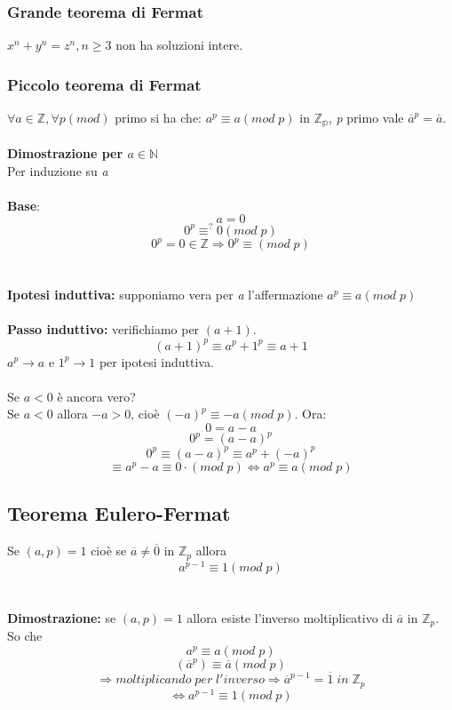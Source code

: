 \subsubsection{Grande teorema di Fermat}
\(x^n+y^n=z^n, n\geq 3\) non ha soluzioni intere.

\subsubsection{Piccolo teorema di Fermat}
\(\forall a\in\mathbb{Z}, \forall p(mod)\) primo si ha che: \(a^p\equiv a(mod\;p)\) in \(\mathbb{Z_p}\), \textit{p} primo vale \(\overline{a}^p=\overline{a}\).
\\\\
\textbf{Dimostrazione per \(a\in\mathbb{N}\)}
\\Per induzione su \textit{a}
\\\\\textbf{Base}: \[a=0\]
\[0^p\equiv ^? 0(mod\;p)\]
\[0^p=0\in\mathbb{Z}\Rightarrow 0^p\equiv (mod\;p)\]
\\\\
\textbf{Ipotesi induttiva:} supponiamo vera per \textit{a} l'affermazione \(a^p\equiv a(mod\;p)\)
\\\\
\textbf{Passo induttivo:} verifichiamo per \((a+1)\).
\[(a+1)^p\equiv a^p+1^p \equiv a+1\]
\(a^p\rightarrow a\) e \(1^p\rightarrow 1\) per ipotesi induttiva.
\\\\
Se \(a<0\) è ancora vero?
\\ Se \(a<0\) allora \(-a>0\), cioè \((-a)^p\equiv -a(mod\;p)\). 
Ora:
\[0=a-a\]
\[0^p=(a-a)^p\]
\[0^p\equiv (a-a)^p\equiv a^p+(-a)^p\]
\[\equiv a^p-a\equiv 0\cdot (mod\;p)\Leftrightarrow a^p\equiv a(mod\;p)\]

\subsection{Teorema Eulero-Fermat}
Se \((a,p)=1\) cioè se \(\overline{a}\neq \overline{0}\) in \(\mathbb{Z}_p\) allora
\[a^{p-1}\equiv 1(mod\;p)\]
\\\\
\textbf{Dimostrazione:} se \((a,p)=1\) allora esiste l'inverso moltiplicativo di \(\overline{a}\) in \(\mathbb{Z}_p\).
\\
So che \[a^p\equiv a(mod\;p)\]
\[(\overline{a}^p)\equiv \overline{a}(mod\;p)\]
\[\Rightarrow moltiplicando\;per\;l'inverso \Rightarrow \overline{a}^{p-1}=\overline{1}\;in\;\mathbb{Z}_p\]
\[\Leftrightarrow a^{p-1}\equiv 1(mod\;p)\]

